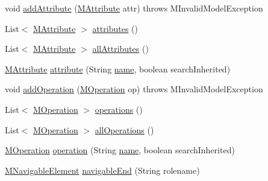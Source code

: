 \begin{DoxyCompactItemize}
\item 
void \hyperlink{classorg_1_1tzi_1_1use_1_1uml_1_1mm_1_1_m_association_class_impl_a84781a5c8e155800674c59c14f24768b}{add\-Attribute} (\hyperlink{classorg_1_1tzi_1_1use_1_1uml_1_1mm_1_1_m_attribute}{M\-Attribute} attr)  throws M\-Invalid\-Model\-Exception 
\item 
List$<$ \hyperlink{classorg_1_1tzi_1_1use_1_1uml_1_1mm_1_1_m_attribute}{M\-Attribute} $>$ \hyperlink{classorg_1_1tzi_1_1use_1_1uml_1_1mm_1_1_m_association_class_impl_a972b8988d8e2c8096ad5241ad8c24af2}{attributes} ()
\item 
List$<$ \hyperlink{classorg_1_1tzi_1_1use_1_1uml_1_1mm_1_1_m_attribute}{M\-Attribute} $>$ \hyperlink{classorg_1_1tzi_1_1use_1_1uml_1_1mm_1_1_m_association_class_impl_af72b732a1d80b87efadbd394b6ceb061}{all\-Attributes} ()
\item 
\hyperlink{classorg_1_1tzi_1_1use_1_1uml_1_1mm_1_1_m_attribute}{M\-Attribute} \hyperlink{classorg_1_1tzi_1_1use_1_1uml_1_1mm_1_1_m_association_class_impl_a59a750bb5e35907a26309d44145c70ca}{attribute} (String \hyperlink{classorg_1_1tzi_1_1use_1_1uml_1_1mm_1_1_m_model_element_impl_ac9997b04c10d247c21c22d431d99400d}{name}, boolean search\-Inherited)
\item 
void \hyperlink{classorg_1_1tzi_1_1use_1_1uml_1_1mm_1_1_m_association_class_impl_afab415880079c180733bfa1a31abd1d8}{add\-Operation} (\hyperlink{classorg_1_1tzi_1_1use_1_1uml_1_1mm_1_1_m_operation}{M\-Operation} op)  throws M\-Invalid\-Model\-Exception 
\item 
List$<$ \hyperlink{classorg_1_1tzi_1_1use_1_1uml_1_1mm_1_1_m_operation}{M\-Operation} $>$ \hyperlink{classorg_1_1tzi_1_1use_1_1uml_1_1mm_1_1_m_association_class_impl_a4b9d30cd032729274af92168a064e5fa}{operations} ()
\item 
List$<$ \hyperlink{classorg_1_1tzi_1_1use_1_1uml_1_1mm_1_1_m_operation}{M\-Operation} $>$ \hyperlink{classorg_1_1tzi_1_1use_1_1uml_1_1mm_1_1_m_association_class_impl_a0db41a04954a0c3eed303fc67ad93f46}{all\-Operations} ()
\item 
\hyperlink{classorg_1_1tzi_1_1use_1_1uml_1_1mm_1_1_m_operation}{M\-Operation} \hyperlink{classorg_1_1tzi_1_1use_1_1uml_1_1mm_1_1_m_association_class_impl_ac33a8954dd1cd71155ae0bbba6f181c4}{operation} (String \hyperlink{classorg_1_1tzi_1_1use_1_1uml_1_1mm_1_1_m_model_element_impl_ac9997b04c10d247c21c22d431d99400d}{name}, boolean search\-Inherited)
\item 
\hyperlink{interfaceorg_1_1tzi_1_1use_1_1uml_1_1mm_1_1_m_navigable_element}{M\-Navigable\-Element} \hyperlink{classorg_1_1tzi_1_1use_1_1uml_1_1mm_1_1_m_association_class_impl_a84a662cccca5e288ea37cba6183354f1}{navigable\-End} (String rolename)

\end{DoxyCompactItemize}
